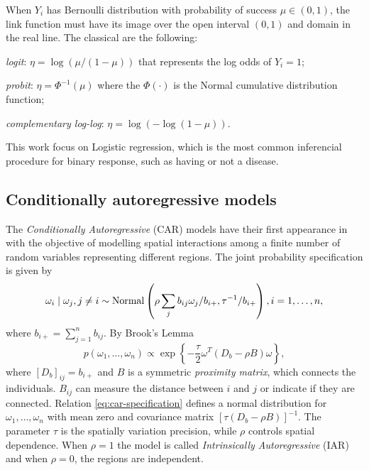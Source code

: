 When $Y_i$ has Bernoulli distribution with probability of success $\mu \in
(0,1)$, the link function must have its image over the open interval $(0,1)$
and domain in the real line. The classical are the following:  

\begin{alineas}
  \item \textit{logit}: $\eta = \log(\mu / (1 - \mu))$ that represents 
  the log odds of $Y_i = 1$;
  \item \textit{probit}: $\eta = \Phi^{-1}(\mu)$ where the $\Phi(\cdot)$ 
  is the Normal cumulative distribution function; 
  \item \textit{complementary log-log}: $\eta = \log(-\log(1 - \mu))$.
\end{alineas}

This work focus on Logistic regression, which is the most common inferencial
procedure for binary response, such as having or not a disease. 

\subsection{Conditionally autoregressive models}
\label{sec:car-models}

The {\em Conditionally Autoregressive} (CAR) models have their first appearance in
\textcite{besag1974spatial} with the objective of modelling spatial
interactions among a finite number of random variables representing
different regions. The joint probability specification is given by
\cite[Section 3.3.1]{banerjee2003hierarchical}
$$
\omega_i \mid \omega_j, j \neq i \sim \operatorname{Normal}\left(\rho\sum_j b_{ij} \omega_j / b_{i+}, \tau^{-1} / b_{i+}\right), i = 1, \dots, n,
$$
where $b_{i+} = \sum_{j=1}^n b_{ij}$. By Brook's Lemma
\cite{brook1964distinction}
\begin{equation}
  \label{eq:car-specification}
  p(\omega_1, \dots, \omega_n) \propto \exp\left\{ -\frac{\tau}{2}\omega^T(D_{b} - \rho B)\omega\right\},
\end{equation}
where $[D_{b}]_{ij} = b_{i+}$ and $B$
is a symmetric {\em proximity matrix}, which connects the individuals.
$B_{ij}$ can measure the distance between $i$ and $j$ or indicate if they are
connected. Relation \eqref{eq:car-specification} defines a normal
distribution for $\omega_1, \dots, \omega_n$ with mean zero and covariance
matrix $[\tau(D_b - \rho B)]^{-1}$. The parameter $\tau$ is the spatially
variation precision, while $\rho$ controls spatial dependence. When $\rho = 1$
the model is called {\em Intrinsically Autoregressive} (IAR) and when $\rho =
0$, the regions are independent. 

